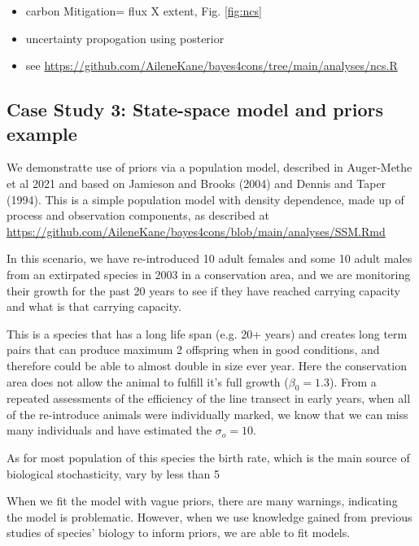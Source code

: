 \documentclass{article}
\begin{document}
\begin{itemize}
\item carbon Mitigation= flux X extent, Fig. \ref{fig:ncs}
\item uncertainty propogation using posterior
\item see \href{https://github.com/AileneKane/bayes4cons/tree/main/analyses/ncs.R}{https://github.com/AileneKane/bayes4cons/tree/main/analyses/ncs.R}
\end{itemize}

\subsection*{Case Study 3: State-space model and priors example}

\par We demonstratte use of priors via a population model, described in Auger-Methe et al 2021 and based on Jamieson and Brooks (2004) and Dennis and Taper (1994). This is a simple population model with density dependence, made up of process and observation components, as described at \href{https://github.com/AileneKane/bayes4cons/blob/main/analyses/SSM.Rmd}{https://github.com/AileneKane/bayes4cons/blob/main/analyses/SSM.Rmd}

\par In this scenario, we have re-introduced 10 adult females and some 10 adult males from an extirpated species in 2003 in a conservation area, and we are monitoring their growth for the past 20 years to see if they have reached carrying capacity and what is that carrying capacity.

\par This is a species that has a long life span (e.g. 20+ years) and creates long term pairs  that can produce maximum 2 offspring when in good conditions, and therefore could be able to almost double in size ever year. Here the conservation area does not allow the animal to fulfill it's full growth ($\beta_0 = 1.3$). From a repeated assessments of the efficiency of the line transect in early years, when all of the re-introduce animals were individually marked, we know that we can miss many individuals and have estimated the $\sigma_o = 10$.

\par As for most population of this species the birth rate, which is the main source of biological stochasticity, vary by less than 5%

\par When we fit the model with vague priors, there are many warnings, indicating the model is problematic. However, when we use knowledge gained from previous studies of species' biology to inform priors, we are able to fit models.
\end{document}
